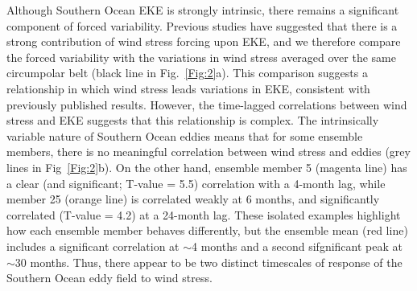 \documentclass{agujournal2019}
\begin{document}
Although Southern Ocean EKE is strongly intrinsic, there remains a significant component of forced variability.
Previous studies have suggested that there is a strong contribution of wind stress forcing upon EKE, and we therefore compare the forced variability with the variations in wind stress averaged over the same circumpolar belt (black line in Fig.~\ref{Fig:2}a).
This comparison suggests a relationship in which wind stress leads variations in EKE, consistent with previously published results.
However, the time-lagged correlations between wind stress and EKE suggests that this relationship is complex. 
The intrinsically variable nature of Southern Ocean eddies means that for some ensemble members, there is no meaningful correlation between wind stress and eddies (grey lines in Fig~\ref{Fig:2}b).
On the other hand, ensemble member 5 (magenta line) has a clear (and significant; T-value = 5.5) correlation with a 4-month lag, while member 25 (orange line) is correlated weakly at 6 months, and significantly correlated (T-value = 4.2) at a 24-month lag.
These isolated examples highlight how each ensemble member behaves differently, but the ensemble mean (red line) includes a significant correlation at $\sim$4 months and a second sifgnificant peak at $\sim$30 months.
Thus, there appear to be two distinct timescales of response of the Southern Ocean eddy field to wind stress. 
\end{document}
